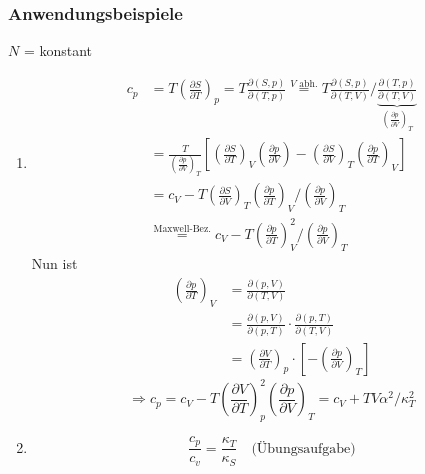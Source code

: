 \subsubsection{Anwendungsbeispiele} $N$ = konstant
\begin{enumerate}  %
    \item
    \begin{equation}
        \begin{split}
            c_p &=  T \left( \frac{\partial S}{\partial T} \right)_p = T \frac{\partial(S, p)}{\partial(T, p)} \overset{\text{$V$ abh.}}{=}
            T \frac{\partial(S, p)}{\partial(T, V)} / \underbrace{\frac{\partial(T, p)}{\partial(T, V)}}_{ \left( \frac{\partial p}{\partial V} \right)_T} \\
            &= \frac{T}{ \left( \frac{\partial p}{\partial V} \right)_T} \left[ \left( \frac{\partial S}{\partial T} \right)_V
            \left( \frac{\partial p}{\partial V} \right) - \left( \frac{\partial S}{\partial V} \right)_T \left( \frac{\partial p}{\partial T} \right)_V \right] \\
            &= c_V - T \left( \frac{\partial S}{\partial V} \right)_T \left( \frac{\partial p}{\partial T} \right)_V / \left( \frac{\partial p}{\partial V} \right)_T \\
            &\overset{\text{Maxwell-Bez.}}{=} c_V - T \left( \frac{\partial p}{\partial T} \right)_V^2 / \left( \frac{\partial p}{\partial V} \right)_T
        \end{split}
    \end{equation}
    Nun ist
    \begin{equation}
        \begin{split}
            \left( \frac{\partial p}{\partial T} \right)_V &= \frac{\partial(p, V)}{\partial (T, V)} \\
            &= \frac{\partial (p, V)}{\partial (p, T)} \cdot \frac{\partial(p, T)}{\partial(T, V)} \\
            &= \left( \frac{\partial V}{\partial T} \right)_p \cdot \left[ - \left( \frac{\partial p}{\partial V} \right)_T \right]
        \end{split}
    \end{equation}
    \begin{equation}
        \Rightarrow c_p = c_V - T \left( \frac{\partial V}{\partial T} \right)_p^2 \left( \frac{\partial p}{\partial V} \right)_T = c_V + T V \alpha^2 / \kappa_T^2
    \end{equation}
    \item
    \begin{equation}
        \frac{c_p}{c_v} = \frac{\kappa_T}{\kappa_S} \quad \text{(Übungsaufgabe)}
    \end{equation}
\end{enumerate}

